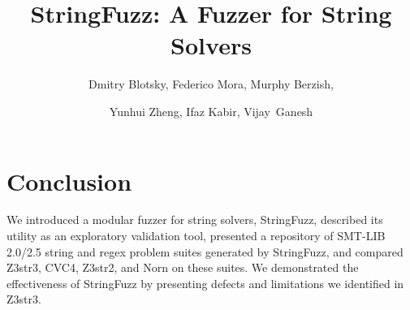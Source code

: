 \documentclass{llncs}
\def\fuzzer{StringFuzz}
\def\smtfull{SMT-LIB 2.0/2.5}
\def\cvc{CVC4}
\def\us{Z3str3}
\def\usOld{Z3str2}
\def\norn{Norn}
\def\theSolvers{\us{}, \cvc{}, \usOld{}, and \norn{}}
\begin{document}
    \pagestyle{headings} %

    \title{
        \fuzzer{}: A Fuzzer for String Solvers
    }
    \titlerunning{\fuzzer{}} %

    \author{
        Dmitry Blotsky,
        Federico Mora,
        Murphy Berzish,\and
        Yunhui Zheng,
        Ifaz Kabir,
        Vijay~Ganesh
    }


    \maketitle

    
    
    
    
    
    
    
    \section{Conclusion}
    \vspace{-0.1in}
    
    We introduced a modular fuzzer for string solvers, \fuzzer{}, described 
its utility as an exploratory validation tool, presented a repository of 
\smtfull{} string and regex problem suites generated by \fuzzer{}, and compared 
\theSolvers{} on these suites. We demonstrated the effectiveness of \fuzzer{} by presenting 
defects and limitations we identified in \us{}.
    
    
    

\end{document}
